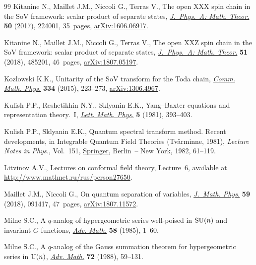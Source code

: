 \documentclass[pdftex]{sigma}
\numberwithin{equation}{section}
\begin{document}
\begin{thebibliography}{99}
Kitanine N., Maillet J.M., Niccoli G., Terras V., The open {XXX} spin chain in
 the {S}o{V} framework: scalar product of separate states, \href{https://doi.org/10.1088/1751-8121/aa6cc9}{\textit{J.~Phys.~A:
 Math. Theor.}} \textbf{50} (2017), 224001, 35~pages, \href{https://arxiv.org/abs/1606.06917}{arXiv:1606.06917}.

Kitanine N., Maillet J.M., Niccoli G., Terras V., The open {XXZ} spin chain in
 the {S}o{V} framework: scalar product of separate states, \href{https://doi.org/10.1088/1751-8121/aae76f}{\textit{J.~Phys.~A:
 Math. Theor.}} \textbf{51} (2018), 485201, 46~pages, \href{https://arxiv.org/abs/1807.05197}{arXiv:1807.05197}.

Kozlowski K.K., Unitarity of the {S}o{V} transform for the {T}oda chain,
 \href{https://doi.org/10.1007/s00220-014-2134-6}{\textit{Comm. Math. Phys.}} \textbf{334} (2015), 223--273, \href{https://arxiv.org/abs/1306.4967}{arXiv:1306.4967}.

Kulish P.P., Reshetikhin N.Y., Sklyanin E.K., Yang--{B}axter equations and
 representation theory.~{I}, \href{https://doi.org/10.1007/BF02285311}{\textit{Lett. Math. Phys.}} \textbf{5} (1981),
 393--403.

Kulish P.P., Sklyanin E.K., Quantum spectral transform method. {R}ecent
 developments, in Integrable Quantum Field Theories ({T}v\"{a}rminne, 1981),
 \textit{Lecture Notes in Phys.}, Vol.~151, \href{https://doi.org/10.1007/3-540-11190-5_8}{Springer}, Berlin~-- New York,
 1982, 61--119.

Litvinov A.V., Lectures on conformal field theory, Lecture~6, available at
 \url{http://www.mathnet.ru/rus/person27650}.

Maillet J.M., Niccoli G., On quantum separation of variables, \href{https://doi.org/10.1063/1.5050989}{\textit{J.~Math.
 Phys.}} \textbf{59} (2018), 091417, 47~pages, \href{https://arxiv.org/abs/1807.11572}{arXiv:1807.11572}.

Milne S.C., A {$q$}-analog of hypergeometric series well-poised in {${\rm
 SU}(n)$} and invariant {$G$}-functions, \href{https://doi.org/10.1016/0001-8708(85)90048-9}{\textit{Adv. Math.}} \textbf{58}
 (1985), 1--60.

Milne S.C., A {$q$}-analog of the {G}auss summation theorem for hypergeometric
 series in {${\rm U}(n)$}, \href{https://doi.org/10.1016/0001-8708(88)90019-9}{\textit{Adv. Math.}} \textbf{72} (1988), 59--131.


\end{thebibliography}
\end{document}
